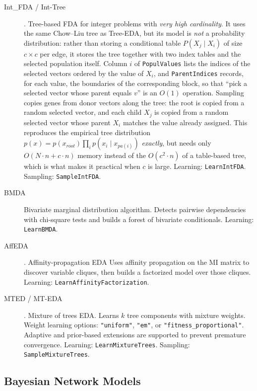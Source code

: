 \documentclass[a4paper,11pt]{article}
\begin{document}
\begin{description}
  \item[Int\_FDA / Int-Tree] \citep{Santana_et_al:2002int}.
    Tree-based FDA for integer problems with \emph{very high cardinality}.  It uses the same Chow--Liu tree as Tree-EDA, but its model is \emph{not} a probability distribution: rather than storing a conditional table $P(X_j\mid X_i)$ of size $c\times c$ per edge, it stores the tree together with two index tables and the selected population itself.
    Column $i$ of \texttt{PopulValues} lists the indices of the selected vectors ordered by the value of $X_i$, and \texttt{ParentIndices} records, for each value, the boundaries of the corresponding block, so that ``pick a selected vector whose parent equals $v$'' is an $O(1)$ operation.
    Sampling copies genes from donor vectors along the tree: the root is copied from a random selected vector, and each child $X_j$ is copied from a random selected vector whose parent $X_i$ matches the value already assigned.  This reproduces the empirical tree distribution $p(x)=p(x_{root})\prod_i p(x_i\mid x_{pa(i)})$ \emph{exactly}, but needs only $O(N\cdot n + c\cdot n)$ memory instead of the $O(c^2\cdot n)$ of a table-based tree, which is what makes it practical when $c$ is large.
    Learning: \texttt{LearnIntFDA}. Sampling: \texttt{SampleIntFDA}.

  \item[BMDA] \citep{Pelikan_and_Muhlenbein:1999}
    Bivariate marginal distribution algorithm.  Detects pairwise dependencies with chi-square tests and builds a forest of bivariate conditionals.
    Learning: \texttt{LearnBMDA}.

  \item[AffEDA] \citep{Santana_et_al:2009c}.
    Affinity-propagation EDA 
    Uses affinity propagation on the MI matrix to discover variable cliques, then builds a factorized model over those cliques.
    Learning: \texttt{LearnAffinityFactorization}.

  \item[MTED / MT-EDA] \citep{Santana_et_al:2001br}.
    Mixture of trees EDA.  Learns $k$ tree components with mixture weights.
    Weight learning options: \texttt{"uniform"}, \texttt{"em"}, or \texttt{"fitness\_proportional"}.  Adaptive and prior-based extensions   are supported to prevent premature convergence.
    Learning: \texttt{LearnMixtureTrees}. Sampling: \texttt{SampleMixtureTrees}.
\end{description}

\subsection{Bayesian Network Models}
\label{sec:bayes}
\end{document}
